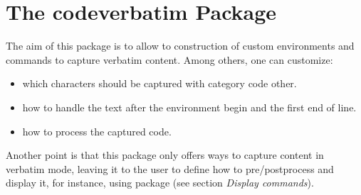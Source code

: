 \documentclass[10pt]{article}
\begin{document}
\section{The codeverbatim Package}\label{pkg:codeverb}
The aim of this package is to allow to construction of custom environments and commands to capture verbatim content. Among others, one can customize:
\begin{itemize}
  \item which characters should be captured with category code other.
  \item how to handle the text after the environment begin and the first end of line.
  \item how to process the captured code.
\end{itemize}
Another point is that this package only offers ways to capture content in verbatim mode, leaving it to the user to define how to pre/postprocess and display it, for instance, using  package (see section \emph{Display commands}).
\end{document}
